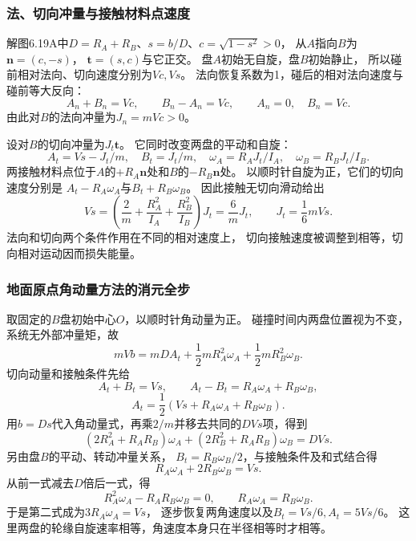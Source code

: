 \documentclass[UTF8,fontset=fandol,a4paper,11pt]{ctexart}
\begin{document}
\subsubsection*{法、切向冲量与接触材料点速度}
解图6.19A中$D=R_A+R_B$、$s=b/D$、$c=\sqrt{1-s^2}>0$，
从$A$指向$B$为$\boldsymbol n=(c,-s)$，
$\boldsymbol t=(s,c)$与它正交。
盘$A$初始无自旋，盘$B$初始静止，
所以碰前相对法向、切向速度分别为$Vc,Vs$。
法向恢复系数为1，碰后的相对法向速度与碰前等大反向：
\[
A_n+B_n=Vc,\qquad B_n-A_n=Vc,
\qquad A_n=0,\quad B_n=Vc.
\]
由此对$B$的法向冲量为$J_n=mVc>0$。

设对$B$的切向冲量为$J_t\boldsymbol t$。
它同时改变两盘的平动和自旋：
\[
A_t=Vs-J_t/m,\quad B_t=J_t/m,
\quad \omega_A=R_AJ_t/I_A,\quad\omega_B=R_BJ_t/I_B.
\]
两接触材料点位于$A$的$+R_A\boldsymbol n$处和$B$的$-R_B\boldsymbol n$处。
以顺时针自旋为正，它们的切向速度分别是
$A_t-R_A\omega_A$与$B_t+R_B\omega_B$。
因此接触无切向滑动给出
\[
Vs=\left(\frac2m+\frac{R_A^2}{I_A}+\frac{R_B^2}{I_B}\right)J_t
=\frac6mJ_t,
\qquad J_t=\frac16mVs.
\]
法向和切向两个条件作用在不同的相对速度上，
切向接触速度被调整到相等，切向相对运动因而损失能量。

\subsubsection*{地面原点角动量方法的消元全步}
取固定的$B$盘初始中心$O$，以顺时针角动量为正。
碰撞时间内两盘位置视为不变，系统无外部冲量矩，故
\[
mVb=mDA_t+\frac12mR_A^2\omega_A+\frac12mR_B^2\omega_B.
\]
切向动量和接触条件先给
\[
A_t+B_t=Vs,\qquad A_t-B_t=R_A\omega_A+R_B\omega_B,
\]
\[
A_t=\frac12(Vs+R_A\omega_A+R_B\omega_B).
\]
用$b=Ds$代入角动量式，再乘$2/m$并移去共同的$DVs$项，得到
\[
(2R_A^2+R_AR_B)\omega_A
+(2R_B^2+R_AR_B)\omega_B=DVs.
\]
另由盘$B$的平动、转动冲量关系，
$B_t=R_B\omega_B/2$，与接触条件及和式结合得
\[
R_A\omega_A+2R_B\omega_B=Vs.
\]
从前一式减去$D$倍后一式，得
\[
R_A^2\omega_A-R_AR_B\omega_B=0,
\qquad R_A\omega_A=R_B\omega_B.
\]
于是第二式成为$3R_A\omega_A=Vs$，
逐步恢复两角速度以及$B_t=Vs/6,A_t=5Vs/6$。
这里两盘的轮缘自旋速率相等，角速度本身只在半径相等时才相等。
\end{document}
